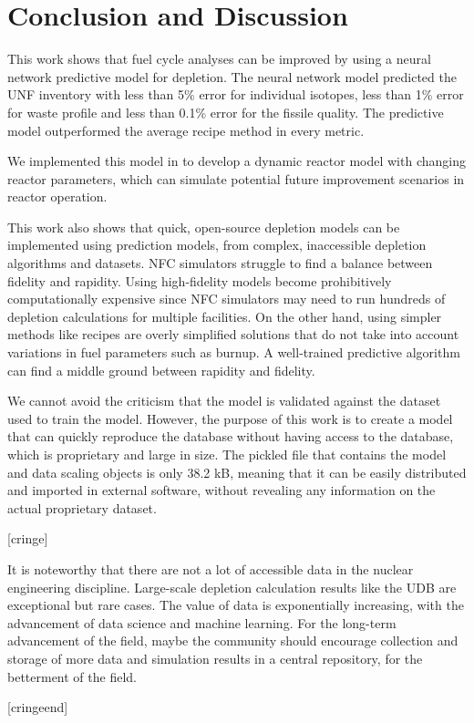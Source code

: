 \section{Conclusion and Discussion}
This work shows that fuel cycle analyses can be improved
by using a neural network predictive model for depletion.
The neural network model predicted the \gls{UNF} inventory
with less than 5\% error for individual isotopes,
less than 1\% error for waste profile 
and less than 0.1\% error for the fissile quality.
The predictive model outperformed the average recipe
method in every metric.

We implemented this model in \Cyclus to develop a
dynamic reactor model with changing reactor parameters,
which can simulate potential future improvement scenarios
in reactor operation.

This work also shows that quick, open-source depletion models
can be implemented using prediction models, from
complex, inaccessible depletion algorithms and
datasets. \gls{NFC} simulators struggle to find a balance
between fidelity and rapidity. Using high-fidelity
models become prohibitively computationally expensive
since \gls{NFC} simulators may need to run
hundreds of depletion calculations for multiple
facilities. On the other hand, using simpler methods
like recipes are overly simplified solutions
that do not take into account variations in fuel
parameters such as burnup.
A well-trained predictive algorithm can find a middle
ground between rapidity and fidelity.

We cannot avoid the criticism that the model is validated
against the dataset used to train the model. However, the purpose
of this work is to create a model that can quickly reproduce the
database without having access to the database, which is proprietary
and large in size. The pickled file that contains
the model and data scaling objects is only 38.2 kB, meaning that it
can be easily distributed and imported in external software, without
revealing any information on the actual proprietary dataset.

[cringe]

It is noteworthy that there are not a lot of accessible data in the
nuclear engineering discipline. Large-scale depletion
calculation results like the \gls{UDB} are exceptional
but rare cases. The value of data is exponentially increasing,
with the advancement of data science and machine learning.
For the long-term advancement of the field, maybe the
community should encourage collection and storage of more
data and simulation results in
a central repository, for the betterment of the field.

[cringeend]

